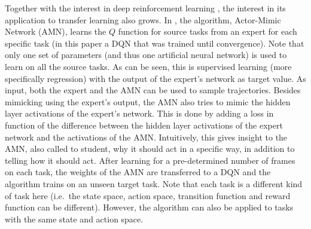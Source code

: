Together with the interest in deep reinforcement learning \parencite{Mnih2015Human-levelLearning,Mnih2016AsynchronousLearning}, the interest in its application to transfer learning also grows.
In \cite{DBLP:journals/corr/ParisottoBS15}, the algorithm, Actor-Mimic Network (AMN), learns the $Q$ function for source tasks from an expert for each specific task (in this paper a DQN that was trained until convergence).
Note that only one set of parameters (and thus one artificial neural network) is used to learn on all the source tasks.
As can be seen, this is supervised learning (more specifically regression) with the output of the expert's network as target value.
As input, both the expert and the AMN can be used to sample trajectories.
Besides mimicking using the expert's output, the AMN also tries to mimic the hidden layer activations of the expert's network.
This is done by adding a loss in function of the difference between the hidden layer activations of the expert network and the activations of the AMN.
Intuitively, this gives insight to the AMN, also called to student, why it should act in a specific way, in addition to telling how it should act.
After learning for a pre-determined number of frames on each task, the weights of the AMN are transferred to a DQN and the algorithm trains on an unseen target task.
Note that each task is a different kind of task here (i.e.\ the state space, action space, transition function and reward function can be different).
However, the algorithm can also be applied to tasks with the same state and action space.

